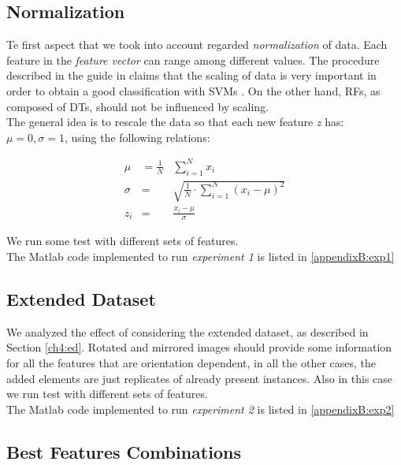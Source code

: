 \vspace{0.5cm}

\subsection{Normalization}

Te first aspect that we took into account regarded \textit{normalization} of data. Each feature in the \textit{feature vector} can range among different values.
The procedure described in the guide in \cite{SVM01} claims that the scaling of data is very important in order to obtain a good classification with \Glspl{SVM} \cite{juszczak2002feature}.
On the other hand, \Glspl{RF}, as composed of \Glspl{DT}, should not be influenced by scaling.\\
The general idea is to rescale the data so that each new feature \textit{z} has: $\mu = 0, \sigma = 1$, using the following relations:

\begin{eqnarray}
 \mu & = \frac{1}{N} & \sum_{i=1}^{N} x_i \\
 \sigma & = & \sqrt{ \frac{1}{N} \cdot \sum_{i=1}^{N}(x_i - \mu)^2 } \\
 z_i & = & \frac{x_i - \mu}{\sigma}
\end{eqnarray}

We run some test with different sets of features.
\\
The Matlab code implemented to run \textit{experiment 1} is listed in \ref{appendixB:exp1}

\vspace{0.5cm}

\subsection{Extended Dataset}

We analyzed the effect of considering the extended dataset, as described in Section \ref{ch4:ed}. Rotated and mirrored images should provide some information for
all the features that are orientation dependent, in all the other cases, the added elements are just replicates of already present instances.
Also in this case we run test with different sets of features.
\\
The Matlab code implemented to run \textit{experiment 2} is listed in \ref{appendixB:exp2}


\vspace{0.5cm}

\subsection{Best Features Combinations}

